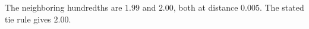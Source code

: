 The neighboring hundredths are $1.99$ and $2.00$, both at distance $0.005$. The stated tie rule gives $\boxed{2.00}$.
